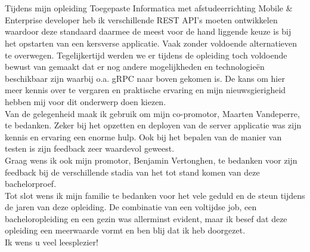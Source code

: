 
\chapter*{}%
\label{ch:voorwoord}

Tijdens mijn opleiding Toegepaste Informatica met afstudeerrichting Mobile \& Enterprise developer heb ik verschillende REST API's moeten ontwikkelen
waardoor deze standaard daarmee de meest voor de hand liggende keuze is bij het opstarten van een kersverse applicatie. Vaak zonder voldoende alternatieven te overwegen.
Tegelijkertijd werden we er tijdens de opleiding toch voldoende bewust van gemaakt dat er nog andere mogelijkheden en technologie\"en beschikbaar zijn waarbij o.a. gRPC naar boven gekomen is.
De kans om hier meer kennis over te vergaren en praktische ervaring en mijn nieuwsgierigheid hebben mij voor dit onderwerp doen kiezen.\\

Van de gelegenheid maak ik gebruik om mijn co-promotor, Maarten Vandeperre, te bedanken. Zeker bij het opzetten en deployen van de server applicatie was
zijn kennis en ervaring een enorme hulp. Ook bij het bepalen van de manier van testen is zijn feedback zeer waardevol geweest.\\

Graag wens ik ook mijn promotor, Benjamin Vertonghen, te bedanken voor zijn feedback bij de verschillende stadia van het tot stand komen van deze bachelorproef.\\

Tot slot wens ik mijn familie te bedanken voor het vele geduld en de steun tijdens de jaren van deze opleiding. De combinatie van een voltijdse job, een bacheloropleiding en
een gezin was allerminst evident, maar ik besef dat deze opleiding een meerwaarde vormt en ben blij dat ik heb doorgezet.\\

Ik wens u veel leesplezier!